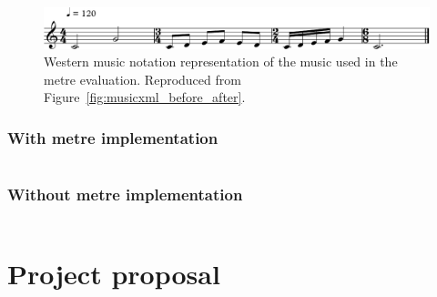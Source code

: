 \documentclass[12pt,twoside,openright]{report}
\begin{document}
\begin{figure}[ht]
    \centering
    \includegraphics[width=\linewidth]{figures/metre_eval_orig.pdf}
    \caption{Western music notation representation of the music used in the metre evaluation. Reproduced from Figure~\ref{fig:musicxml_before_after}.}
    \label{fig:appendix_musicxml_before}
\end{figure}


\subsection*{With metre implementation}

\inputminted[linenos=true]{ruby}{figures/metre_eval_code.rb}


\subsection*{Without metre implementation}

\begin{multicols}{2}
    \inputminted[linenos=true]{ruby}{figures/metre_eval_bad_code.rb}
\end{multicols}





\chapter{Project proposal} \label{project_proposal}
\end{document}
